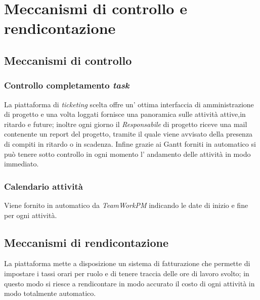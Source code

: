 \section{Meccanismi di controllo e rendicontazione}
\subsection{Meccanismi di controllo}
\subsubsection{Controllo completamento \textit{task}}
La piattaforma di \textit{ticketing} scelta offre un' ottima interfaccia di amministrazione di progetto e una volta loggati fornisce una panoramica sulle attività attive,in ritardo e future; inoltre ogni giorno il \textit{Responsabile} di progetto riceve una mail contenente un report del progetto, tramite il quale viene avvisato della presenza di compiti in ritardo o in scadenza. Infine grazie ai Gantt forniti in automatico si può tenere sotto controllo in ogni momento l' andamento delle attività in modo immediato.
\subsubsection{Calendario attività}
Viene fornito in automatico da \textit{TeamWorkPM} indicando le date di inizio e fine per ogni attività.
\subsection{Meccanismi di rendicontazione}
La piattaforma mette a disposizione un sistema di fatturazione che permette di impostare i tassi orari per ruolo e di tenere traccia delle ore di lavoro svolto; in questo modo si riesce a rendicontare in modo accurato il costo di ogni attività in modo totalmente automatico.